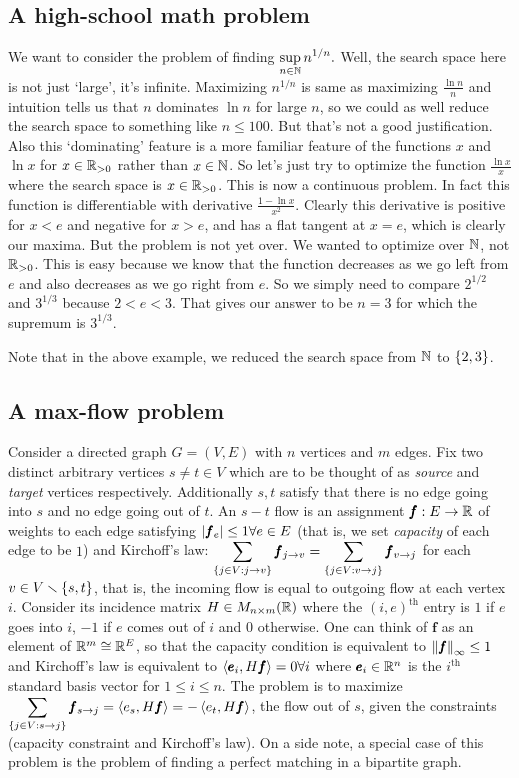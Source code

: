 \subsection{A high-school math problem}

We want to consider the problem of finding $\displaystyle \sup\limits_{n\in\mathbb{N}}n^{1/n}.$ Well, the search space here is not just `large', it's infinite. Maximizing $n^{1/n}$ is same as maximizing $\frac{\ln n}{n}$ and intuition tells us that $n$ dominates $\ln n$ for large $n$, so we could as well reduce the search space to something like $n\leq 100$. But that's not a good justification. Also this `dominating' feature is a more familiar feature of the functions $x$ and $\ln x$ for $x\in \mathbb{R}_{>0}$ rather than $x\in\mathbb{N}$. So let's just try to optimize the function $\frac{\ln x}{x}$ where the search space is $x\in\mathbb{R}_{>0}$. This is now a continuous problem. In fact this function is differentiable with derivative $\frac{1-\ln x}{x^2}$. Clearly this derivative is positive for $x<e$ and negative for $x>e$, and has a flat tangent at $x=e$, which is clearly our maxima. But the problem is not yet over. We wanted to optimize over $\mathbb{N}$, not $\mathbb{R}_{>0}$.  This is easy because we know that the function decreases as we go left from $e$ and also decreases as we go right from $e$. So we simply need to compare $2^{1/2}$ and $3^{1/3}$ because $2<e<3$. That gives our answer to be $n=3$ for which the supremum is $3^{1/3}$.


Note that in the above example, we reduced the search space from $\mathbb{N}$ to $\left\{2,3\right\}$.

\subsection{A max-flow problem}
Consider a directed graph $G=(V,E)$ with $n$ vertices and $m$ edges. Fix two distinct arbitrary vertices $s\neq t\in V$ which are to be thought of as \textit{source} and \textit{target} vertices respectively. Additionally $s,t$ satisfy that there is no edge going into $s$ and no edge going out of $t$. An $s-t$ flow is an assignment $\pmb f:E\to \mathbb{R}$ of weights to each edge satisfying $\left| \pmb f_{e} \right|\leq 1\forall e\in E$ (that is, we set \textit{capacity} of each edge to be $1$) and Kirchoff's law: $\displaystyle \sum_{\left\{j\in V:j\to v\right\}}\pmb f_{j\to v} = \sum_{\left\{j\in V:v\to j\right\}}\pmb f_{v\to j}$ for each $v\in V\smallsetminus\left\{s,t\right\}$, that is, the incoming flow is equal to outgoing flow at each vertex $i$. 
Consider its incidence matrix $H\in M_{n\times m}(\mathbb{R})$ where the $(i,e)^{\text{th}}$ entry is $1$ if $e$ goes into $i$, $-1$ if $e$ comes out of $i$ and $0$ otherwise. One can think of $\pmb f$ as an element of $\mathbb{R}^m\cong \mathbb{R}^E$, so that the capacity condition is equivalent to $\left\lVert \pmb f \right\rVert_{\infty}\leq 1$ and Kirchoff's law is equivalent to $\left\langle \pmb e_i, H\pmb f \right\rangle=0\forall i$ where $\pmb e_i\in \mathbb{R}^n$ is the $i^{\text{th}}$ standard basis vector for $1\leq i\leq n$. The problem is to maximize $\displaystyle \sum_{\left\{j\in V:s\to j\right\}}\pmb f_{s\to j} = \left\langle e_s, H\pmb f \right\rangle = -\left\langle e_t, H\pmb f \right\rangle$, the flow out of $s$, given the constraints (capacity constraint and Kirchoff's law). On a side note, a special case of this problem is the problem of finding a perfect matching in a bipartite graph.

